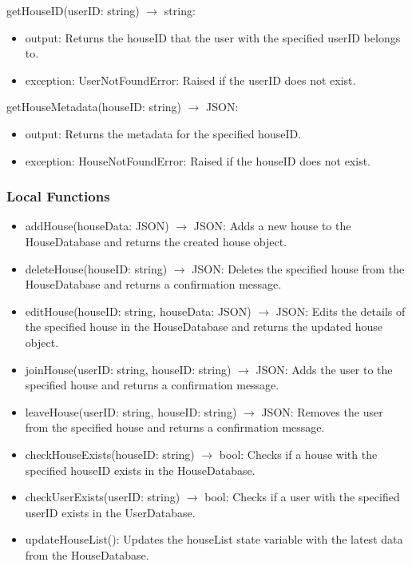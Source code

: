 \documentclass[12pt, titlepage]{article}
\begin{document}
\noindent getHouseID(userID: string) $\rightarrow$ string:
\begin{itemize}
\item output: Returns the houseID that the user with the specified userID belongs to.
\item exception: UserNotFoundError: Raised if the userID does not exist.
\end{itemize}

\noindent getHouseMetadata(houseID: string) $\rightarrow$ JSON:
\begin{itemize}
\item output: Returns the metadata for the specified houseID.
\item exception: HouseNotFoundError: Raised if the houseID does not exist.
\end{itemize}

\subsubsection{Local Functions}

\begin{itemize}
  \item addHouse(houseData: JSON) $\rightarrow$ JSON: Adds a new house to the HouseDatabase and returns the created house object.
  \item deleteHouse(houseID: string) $\rightarrow$ JSON: Deletes the specified house from the HouseDatabase and returns a confirmation message.
  \item editHouse(houseID: string, houseData: JSON) $\rightarrow$ JSON: Edits the details of the specified house in the HouseDatabase and returns the updated house object.
  \item joinHouse(userID: string, houseID: string) $\rightarrow$ JSON: Adds the user to the specified house and returns a confirmation message.
  \item leaveHouse(userID: string, houseID: string) $\rightarrow$ JSON: Removes the user from the specified house and returns a confirmation message.
  \item checkHouseExists(houseID: string) $\rightarrow$ bool: Checks if a house with the specified houseID exists in the HouseDatabase.
  \item checkUserExists(userID: string) $\rightarrow$ bool: Checks if a user with the specified userID exists in the UserDatabase.
  \item updateHouseList(): Updates the houseList state variable with the latest data from the HouseDatabase.
\end{itemize}
\end{document}
